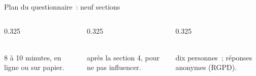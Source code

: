 \begin{frame}{Plan du questionnaire~: neuf sections}
  \vspace{0.05cm}
  \begin{columns}[T]
    \begin{column}{0.325\textwidth}
      \begin{carte}[height=1.25cm,valign=top]
        \raggedright{}\\[1pt]{\footnotesize 8 à 10 minutes, en ligne ou sur papier.}
      \end{carte}
    \end{column}
    \begin{column}{0.325\textwidth}
      \begin{carte}[height=1.25cm,valign=top]
        \raggedright{}\\[1pt]{\footnotesize après la section 4, pour ne pas influencer.}
      \end{carte}
    \end{column}
    \begin{column}{0.325\textwidth}
      \begin{carte}[height=1.25cm,valign=top]
        \raggedright{}\\[1pt]{\footnotesize dix personnes~; réponses anonymes (RGPD).}
      \end{carte}
    \end{column}
  \end{columns}
\end{frame}

